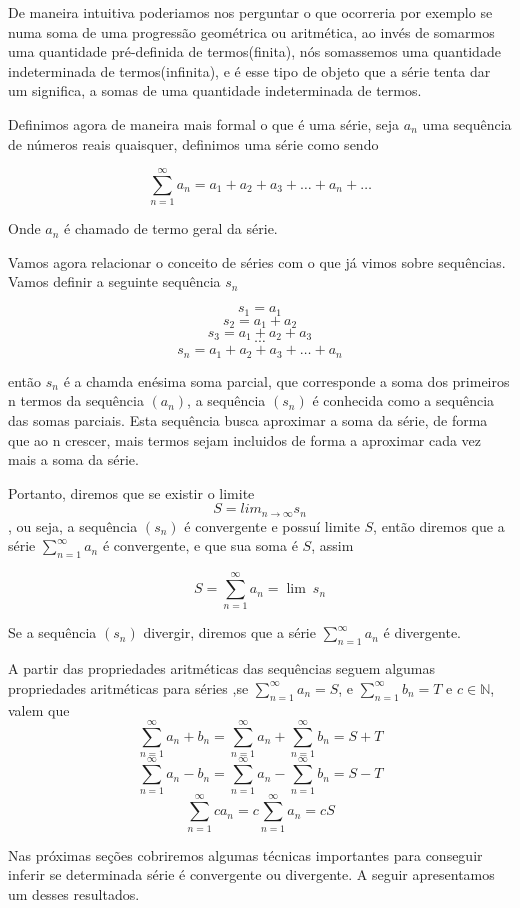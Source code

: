 De maneira intuitiva poderiamos nos perguntar o que ocorreria por exemplo se numa 
soma de uma progressão geométrica ou aritmética, ao invés de somarmos uma 
quantidade pré-definida de termos(finita), nós somassemos uma quantidade 
indeterminada de termos(infinita), e é esse tipo de objeto que a série tenta dar
um significa, a somas de uma quantidade indeterminada de termos.

Definimos agora de maneira mais formal o que é uma série, seja $a_n$ uma 
sequência de números reais quaisquer, definimos uma série como sendo

$$\sum_{n = 1}^{\infty} a_n = a_1 + a_2 + a_3 + \dots + a_n + \dots $$

Onde $a_n$ é chamado de termo geral da série.

Vamos agora relacionar o conceito de séries com o que já vimos sobre sequências.
Vamos definir a seguinte sequência $s_n$

$$ s_1 = a_1$$
$$ s_2 = a_1 + a_2$$
$$ s_3 = a_1 + a_2 + a_3$$
$$\cdots$$
$$ s_n = a_1 + a_2 + a_ 3 + \dots + a_n$$

então $s_n$ é a chamda enésima soma parcial, que corresponde a soma dos primeiros
n termos da sequência $(a_n)$, a sequência $(s_n)$ é conhecida como a sequência 
das somas parciais. Esta sequência busca aproximar a soma da série, de forma que
ao n crescer, mais termos sejam incluidos de forma a aproximar cada vez mais a 
soma da série. 

Portanto, diremos que se existir o limite 
$$ S = lim_{n \to \infty} s_n$$,
ou seja, a sequência $(s_n)$ é convergente e possuí limite $S$, então diremos
que a série $\sum_{n = 1}^{\infty} a_n$ é convergente, e que sua soma é $S$,
assim

$$ S = \sum_{n = 1}^{\infty} a_n = \lim{\:} s_n$$ 

Se a sequência $(s_n)$ divergir, diremos que a série $\sum_{n = 1}^{\infty} a_n$
é divergente.

A partir das propriedades aritméticas das sequências seguem algumas propriedades
aritméticas para séries ,se $\sum_{n = 1}^{\infty} a_n = S$, e
$\sum_{n = 1}^{\infty} b_n = T$ e $c \in \mathbb{N}$, valem que
$$\sum_{n = 1}^{\infty} a_n + b_n= \sum_{n = 1}^{\infty} a_n +\sum_{n = 1}^{\infty} b_n = S + T $$
$$\sum_{n = 1}^{\infty} a_n - b_n= \sum_{n = 1}^{\infty} a_n -\sum_{n = 1}^{\infty} b_n = S - T $$
$$\sum_{n = 1}^{\infty} c a_n = c \sum_{n = 1}^{\infty} a_n = c S$$

Nas próximas seções cobriremos algumas técnicas importantes para conseguir inferir
se determinada série é convergente ou divergente. A seguir apresentamos um desses
resultados.

